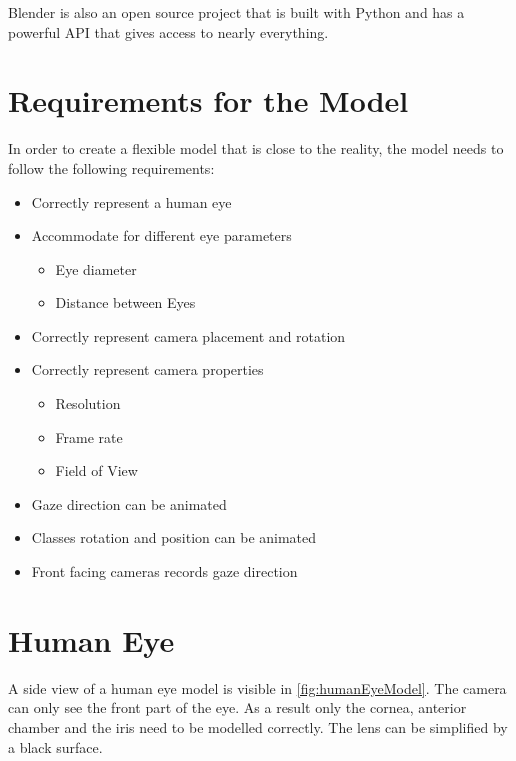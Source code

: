 Blender is also an open source project that is built with Python and has a powerful \gls{API} that gives access to nearly everything.
\section{Requirements for the Model}
In order to create a flexible model that is close to the reality, the model needs to follow the following requirements:
\begin{itemize}
	\item Correctly represent a human eye
	\item Accommodate for different eye parameters
	\begin{itemize}
		\item Eye diameter
		\item Distance between Eyes
	\end{itemize}
	\item Correctly represent camera placement and rotation
	\item Correctly represent camera properties
	\begin{itemize}
		\item Resolution
		\item Frame rate
		\item Field of View
	\end{itemize}
	\item Gaze direction can be animated
	\item Classes rotation and position can be animated
	\item Front facing cameras records gaze direction
\end{itemize}

\section{Human Eye}
A side view of a human eye model is visible in \ref{fig:humanEyeModel}. The camera can only see the front part of the eye. As a result only the cornea, anterior chamber and the iris need to be modelled correctly. The lens can be simplified by a black surface. 

